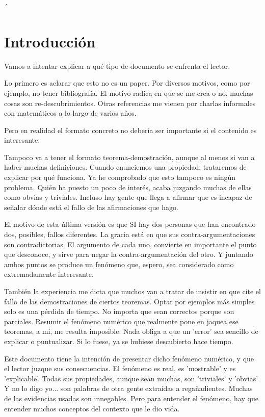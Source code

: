 ´\chapter{Introducción}

Vamos a intentar explicar a qué tipo de documento se enfrenta el lector.

Lo primero es aclarar que esto no es un paper. Por diversos motivos, como por ejemplo, no tener bibliografía. El motivo radica en que se me crea o no, muchas cosas son re-descubrimientos. Otras referencias me vienen por charlas informales con matemáticos a lo largo de varios años.

Pero en realidad el formato concreto no debería ser importante si el contenido es interesante.

Tampoco va a tener el formato teorema-demostración, aunque al menos si van a haber muchas definiciones. Cuando enunciemos una propiedad, trataremos de explicar por qué funciona. Ya he comprobado que esto tampoco es ningún problema. Quién ha puesto un poco de interés, acaba juzgando muchas de ellas como obvias y triviales. Incluso hay gente que llega a afirmar que es incapaz de señalar dónde está el fallo de las afirmaciones que hago.

El motivo de esta última versión es que SI hay dos personas que han encontrado dos, posibles, fallos diferentes. La gracia está en que sus contra-argumentaciones son contradictorias. El argumento de cada uno, convierte en importante el punto que desconoce, y sirve para negar la contra-argumentación del otro. Y juntando ambos puntos se produce un fenómeno que, espero, sea considerado como extremadamente interesante.

También la experiencia me dicta que muchos van a tratar de insistir en que cite el fallo de las demostraciones de ciertos teoremas. Optar por ejemplos más simples solo es una pérdida de tiempo. No importa que sean correctos porque son parciales. Resumir el fenómeno numérico que realmente pone en jaquea ese teoremas, a mi, me resulta imposible. Nada obliga a que un 'error' sea sencillo de explicar o puntualizar. Si lo fuese, ya se hubiese descubierto hace tiempo.

Este documento tiene la intención de presentar dicho fenómeno numérico, y que el lector juzque sus consecuencias. El fenómeno es real, es 'mostrable' y es 'explicable'. Todas sus propiedades, aunque sean muchas, son 'triviales' y 'obvias'. Y no lo digo yo... son palabras de otra gente extraídas a regañadientes. Muchas de las evidencias usadas son innegables. Pero para entender el fenómeno, hay que entender muchos conceptos del contexto que le dio vida.

